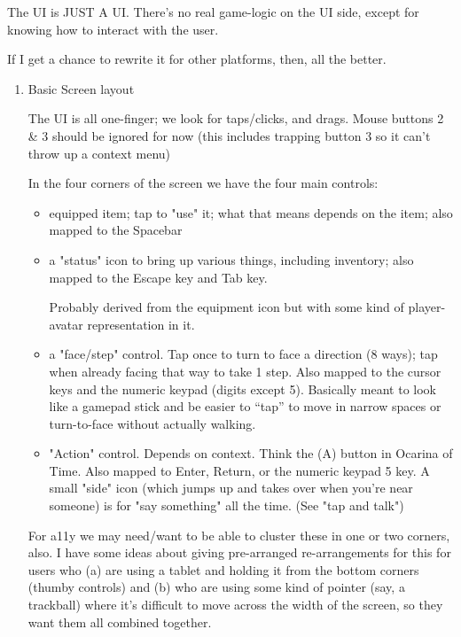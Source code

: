 \documentclass[11pt]{article}
\begin{document}
The UI is JUST A UI. There's no real game-logic on the UI side, except
for knowing how to interact with the user.

If  I get  a  chance to  rewrite  it for  other  platforms, then,  all
the better.

\begin{enumerate}
\item Basic Screen layout
\label{sec-1-5-2-1}

The UI  is all one-finger; we  look for taps/clicks, and  drags. Mouse
buttons 2 \& 3 should be ignored for now (this includes trapping button
3 so it can't throw up a context menu)


In the four corners of the screen we have the four main controls:

\begin{itemize}
\item equipped item;  tap to  "use" it;  what that  means depends  on the
item; also mapped to the Spacebar

\item a "status"  icon to bring  up various things,  including inventory;
also mapped to the Escape key and Tab key.

Probably  derived from  the equipment  icon but  with some  kind of
player-avatar representation in it.

\item a "face/step"  control. Tap  once to  turn to  face a  direction (8
ways); tap when already facing that way to take 1 step. Also mapped
to  the  cursor   keys  and  the  numeric   keypad  (digits  except
5). Basically meant  to look like a gamepad stick  and be easier to
“tap”   to  move   in   narrow  spaces   or  turn-to-face   without
actually walking.

\item "Action"  control. Depends  on  context. Think  the  (A) button  in
Ocarina  of Time.  Also mapped  to  Enter, Return,  or the  numeric
keypad 5  key. A small "side"  icon (which jumps up  and takes over
when you're near someone) is for "say something" all the time. (See
"tap and talk")
\end{itemize}


For a11y we  may need/want to be  able to cluster these in  one or two
corners,   also.  I   have  some   ideas  about   giving  pre-arranged
re-arrangements for  this for  users who  (a) are  using a  tablet and
holding it from  the bottom corners (thumby controls) and  (b) who are
using some kind of pointer (say,  a trackball) where it's difficult to
move  across  the  width  of  the   screen,  so  they  want  them  all
combined together.


\end{enumerate}
\end{document}
